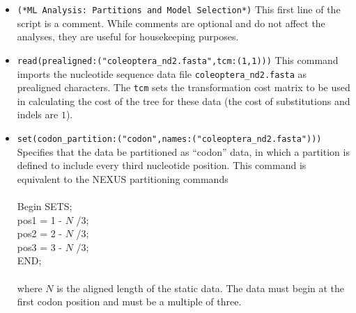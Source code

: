 \begin{itemize}
\item \texttt{(*ML Analysis: Partitions and Model Selection*)} This first line 
of the script is a comment. While comments are optional and do not affect the 
analyses, they are useful for housekeeping purposes. 
\item \texttt{read(prealigned:("coleoptera\_nd2.fasta",tcm:(1,1)))} This command 
imports the nucleotide sequence data file \texttt{coleoptera\_nd2.fasta} as 
prealigned characters.  The \texttt{tcm} sets the transformation cost matrix 
to be used in calculating the cost of the tree for these data (the cost of substitutions 
and indels are $1$). 
\item \texttt{set(codon\_partition:("codon",names:("coleoptera\_nd2.fasta")))} 
Specifies that the data be partitioned as ``codon'' data, in which a partition is 
defined to include every third nucleotide position. This command is equivalent 
to the NEXUS partitioning commands
\\
\\
Begin SETS;\\
pos1 = 1 - $N$ /3;\\
pos2 = 2 - $N$ /3;\\
pos3 = 3 - $N$ /3;\\
END;\\
\\
where $N$ is the aligned length of the static data. The data must begin at the 
first codon position and must be a multiple of three.



\end{itemize}
